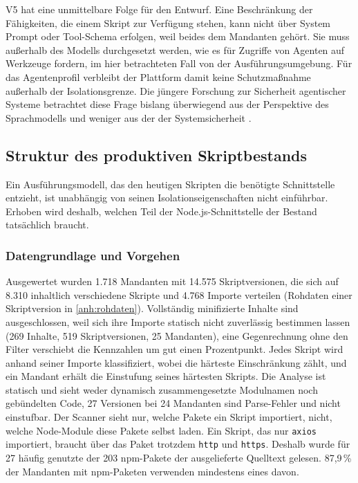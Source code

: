 V5 hat eine unmittelbare Folge für den Entwurf. Eine Beschränkung der Fähigkeiten, die einem
Skript zur Verfügung stehen, kann nicht über System Prompt oder Tool-Schema erfolgen, weil beides
dem Mandanten gehört. Sie muss außerhalb des Modells durchgesetzt werden, wie es \textcite[S.~1--2]{ji_taming_2026} für Zugriffe von Agenten auf Werkzeuge fordern, im hier betrachteten Fall von der Ausführungsumgebung. Für das
Agentenprofil verbleibt der Plattform damit keine Schutzmaßnahme außerhalb der Isolationsgrenze.
Die jüngere Forschung zur Sicherheit agentischer Systeme betrachtet diese Frage bislang
überwiegend aus der Perspektive des Sprachmodells und weniger aus der der Systemsicherheit \autocite[S.~1]{christodorescu_systems_2025}.

\subsection{Struktur des produktiven Skriptbestands}
\label{sec:bestandsanalyse}

Ein Ausführungsmodell, das den heutigen Skripten die benötigte Schnittstelle entzieht, ist
unabhängig von seinen Isolationseigenschaften nicht einführbar. Erhoben wird deshalb, welchen Teil der
Node.js-Schnittstelle der Bestand tatsächlich braucht.

\subsubsection{Datengrundlage und Vorgehen}

Ausgewertet wurden 1.718 Mandanten mit 14.575 Skriptversionen, die sich auf 8.310 inhaltlich verschiedene Skripte und
4.768 Importe verteilen (Rohdaten einer Skriptversion in \ref{anh:rohdaten}). Vollständig minifizierte Inhalte sind ausgeschlossen, weil sich ihre Importe statisch nicht
zuverlässig bestimmen lassen (269 Inhalte, 519 Skriptversionen, 25 Mandanten), eine Gegenrechnung ohne den Filter
verschiebt die Kennzahlen um gut einen Prozentpunkt. Jedes Skript wird anhand seiner Importe klassifiziert, wobei die
härteste Einschränkung zählt, und ein Mandant erhält die Einstufung seines härtesten Skripts. Die Analyse ist
statisch und sieht weder dynamisch zusammengesetzte Modulnamen noch gebündelten Code, 27 Versionen bei 24 Mandanten sind
Parse-Fehler und nicht einstufbar. Der Scanner sieht nur, welche Pakete ein Skript importiert, nicht, welche
Node-Module diese Pakete selbst laden. Ein Skript, das nur \texttt{axios} importiert, braucht über das Paket trotzdem
\texttt{http} und \texttt{https}. Deshalb wurde für 27 häufig genutzte der 203 npm-Pakete der ausgelieferte Quelltext
gelesen. 87,9\,\% der Mandanten mit npm-Paketen verwenden mindestens eines davon.

